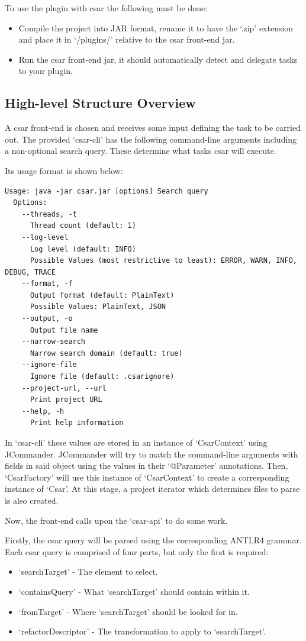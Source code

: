 \documentclass[12pt, letterpaper]{article}
\begin{document}
To use the plugin with csar the following must be done:
\begin{itemize}
  \item Compile the project into JAR format, rename it to have the `.zip' extension and place it in `/plugins/' relative to the csar front-end jar.
  \item Run the csar front-end jar, it should automatically detect and delegate tasks to your plugin.
\end{itemize}

\subsection{High-level Structure Overview}
A csar front-end is chosen and receives some input defining the task to be carried out.
The provided `csar-cli' has the following command-line arguments including a non-optional search query.
These determine what tasks csar will execute.

Its usage format is shown below:
\begin{lstlisting}
Usage: java -jar csar.jar [options] Search query
  Options:
    --threads, -t
      Thread count (default: 1)
    --log-level
      Log level (default: INFO)
      Possible Values (most restrictive to least): ERROR, WARN, INFO, DEBUG, TRACE
    --format, -f
      Output format (default: PlainText)
      Possible Values: PlainText, JSON
    --output, -o
      Output file name
    --narrow-search
      Narrow search domain (default: true)
    --ignore-file
      Ignore file (default: .csarignore)
    --project-url, --url
      Print project URL
    --help, -h
      Print help information
\end{lstlisting}

In `csar-cli' these values are stored in an instance of `CsarContext' using JCommander.
JCommander will try to match the command-line arguments with fields in said object using the values in their `@Parameter' annotations.
Then, `CsarFactory' will use this instance of `CsarContext' to create a corresponding instance of `Csar'.
At this stage, a project iterator which determines files to parse is also created.

Now, the front-end calls upon the `csar-api' to do some work.

Firstly, the csar query will be parsed using the corresponding ANTLR4 grammar.
Each csar query is comprised of four parts, but only the first is required:
\begin{itemize}
  \item `searchTarget' - The element to select.
  \item `containsQuery' - What `searchTarget' should contain within it.
  \item `fromTarget' - Where `searchTarget' should be looked for in.
  \item `refactorDescriptor' - The transformation to apply to `searchTarget'.
\end{itemize}
\end{document}
